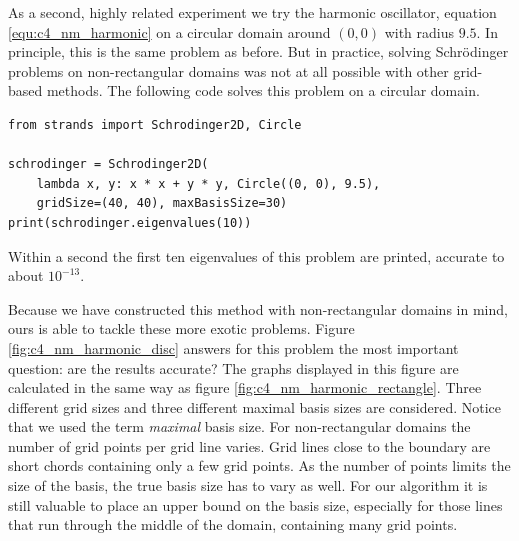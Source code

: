 As a second, highly related experiment we try the harmonic oscillator, equation \eqref{equ:c4_nm_harmonic} on a circular domain around $(0, 0)$ with radius $9.5$. In principle, this is the same problem as before. But in practice, solving Schrödinger problems on non-rectangular domains was not at all possible with other grid-based methods. The following code solves this problem on a circular domain.
\begin{verbatim}
from strands import Schrodinger2D, Circle

schrodinger = Schrodinger2D(
    lambda x, y: x * x + y * y, Circle((0, 0), 9.5),
    gridSize=(40, 40), maxBasisSize=30)
print(schrodinger.eigenvalues(10))
\end{verbatim}
Within a second the first ten eigenvalues of this problem are printed, accurate to about $10^{-13}$.

Because we have constructed this method with non-rectangular domains in mind, ours is able to tackle these more exotic problems. Figure \ref{fig:c4_nm_harmonic_disc} answers for this problem the most important question: are the results accurate? The graphs displayed in this figure are calculated in the same way as figure \ref{fig:c4_nm_harmonic_rectangle}. Three different grid sizes and three different maximal basis sizes are considered. Notice that we used the term \emph{maximal} basis size. For non-rectangular domains the number of grid points per grid line varies. Grid lines close to the boundary are short chords containing only a few grid points. As the number of points limits the size of the basis, the true basis size has to vary as well. For our algorithm it is still valuable to place an upper bound on the basis size, especially for those lines that run through the middle of the domain, containing many grid points.

